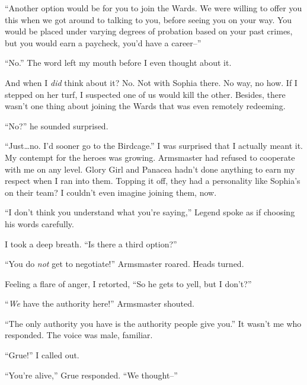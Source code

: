 ``Another option would be for you to join the Wards.  We were willing to offer you this when we got around to talking to you, before seeing you on your way.  You would be placed under varying degrees of probation based on your past crimes, but you would earn a paycheck, you'd have a career--''



``No.'' The word left my mouth before I even thought about it.



And when I \emph{did} think about it?  No.  Not with Sophia there.  No way, no how.  If I stepped on her turf, I suspected one of us would kill the other.  Besides, there wasn't one thing about joining the Wards that was even remotely redeeming.



``No?'' he sounded surprised.



``Just\ldots no.  I'd sooner go to the Birdcage.''  I was surprised that I actually meant it.  My contempt for the heroes was growing.  Armsmaster had refused to cooperate with me on any level.  Glory Girl and Panacea hadn't done anything to earn my respect when I ran into them.  Topping it off, they had a personality like Sophia's on their team?  I couldn't even imagine joining them, now.



``I don't think you understand what you're saying,'' Legend spoke as if choosing his words carefully.



I took a deep breath.  ``Is there a third option?''



``You do \emph{not} get to negotiate!'' Armsmaster roared.  Heads turned.



Feeling a flare of anger, I retorted, ``So he gets to yell, but I don't?''



``\emph{We} have the authority here!'' Armsmaster shouted.



``The only authority you have is the authority people give you.''  It wasn't me who responded.  The voice was male, familiar.



``Grue!'' I called out.



``You're alive,'' Grue responded.  ``We thought--''



